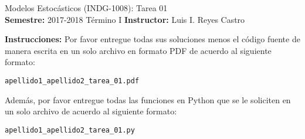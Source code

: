 \documentclass[ a4paper, twoside, 11pt]{article}
\newcommand{\numero}{01}
\begin{document}
\allowdisplaybreaks



\begin{center}
\Large Modelos Estoc\'asticos (INDG-1008): Tarea \numero \\[1ex]
\small \textbf{Semestre:} 2017-2018 T\'ermino I \qquad
\textbf{Instructor:} Luis I. Reyes Castro
\end{center}
\fullskip

%

\textbf{Instrucciones:} Por favor entregue todas sus soluciones menos el c\'odigo fuente de manera escrita en un solo archivo en formato PDF de acuerdo al siguiente formato: 
\halfcut
\begin{center}
{\tt apellido1\_apellido2\_tarea\_01.pdf }
\end{center}
Adem\'as, por favor entregue todas las funciones en Python que se le soliciten en un solo archivo de acuerdo al siguiente formato: 
\halfcut
\begin{center}
{\tt apellido1\_apellido2\_tarea\_01.py }
\end{center}
\fullskip
\halfskip

%

%
\end{document}
